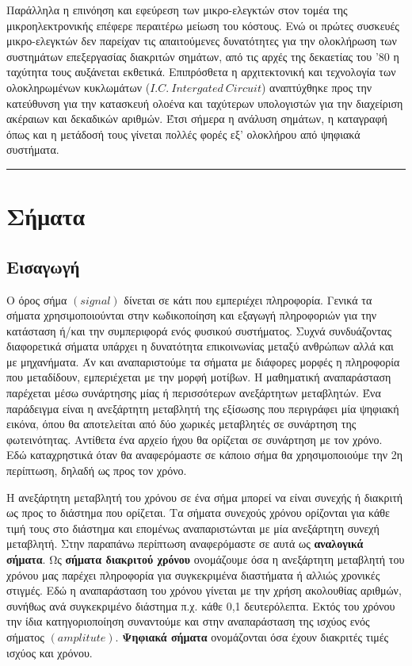 \documentclass[breaklines=true, 12pt]{article}
\begin{document}
Παράλληλα η επινόηση και εφεύρεση των μικρο-ελεγκτών στον τομέα της
μικροηλεκτρονικής επέφερε περαιτέρω μείωση του κόστους. Ενώ οι
πρώτες συσκευές μικρο-ελεγκτών δεν παρείχαν τις απαιτούμενες δυνατότητες
για την ολοκλήρωση των συστημάτων επεξεργασίας διακριτών σημάτων, από
τις αρχές της δεκαετίας του '80 η ταχύτητα τους αυξάνεται εκθετικά.
Επιπρόσθετα η αρχιτεκτονική και τεχνολογία των ολοκληρωμένων κυκλωμάτων
(\({I.C.\ Intergated\ Circuit}\)) αναπτύχθηκε προς την κατεύθυνση για την κατασκευή
ολοένα και ταχύτερων υπολογιστών για την διαχείριση ακέραιων και δεκαδικών
αριθμών. Έτσι σήμερα η ανάλυση σημάτων, η καταγραφή όπως και η μετάδοσή τους
γίνεται πολλές φορές εξ' ολοκλήρου από ψηφιακά συστήματα.

\noindent\rule{\textwidth}{0.5pt}
\section{Σήματα}
\label{sec:orgca9a577}
\subsection{Εισαγωγή}
\label{sec:orge1b0aea}
Ο όρος σήμα \({(signal)}\) δίνεται σε κάτι που εμπεριέχει πληροφορία. Γενικά
τα σήματα χρησιμοποιούνται στην κωδικοποίηση και εξαγωγή πληροφοριών για
την κατάσταση ή/και την συμπεριφορά ενός φυσικού συστήματος. Συχνά
συνδυάζοντας διαφορετικά σήματα υπάρχει η δυνατότητα επικοινωνίας μεταξύ
ανθρώπων αλλά και με μηχανήματα. Άν και αναπαριστούμε τα σήματα με διάφορες
μορφές η πληροφορία που μεταδίδουν, εμπεριέχεται με την μορφή μοτίβων. Η
μαθηματική αναπαράσταση παρέχεται μέσω συνάρτησης μίας ή περισσότερων
ανεξάρτητων μεταβλητών. Ένα παράδειγμα είναι η ανεξάρτητη μεταβλητή της
εξίσωσης που περιγράφει μία ψηφιακή εικόνα, όπου θα αποτελείται από δύο
χωρικές μεταβλητές σε συνάρτηση της φωτεινότητας. Αντίθετα ένα αρχείο ήχου
θα ορίζεται σε συνάρτηση με τον χρόνο. Εδώ καταχρηστικά όταν θα αναφερόμαστε
σε κάποιο σήμα θα χρησιμοποιούμε την 2η περίπτωση, δηλαδή ως προς τον χρόνο.

Η ανεξάρτητη μεταβλητή του χρόνου σε ένα σήμα μπορεί να είναι συνεχής ή
διακριτή ως προς το διάστημα που ορίζεται. Τα σήματα συνεχούς χρόνου
ορίζονται για κάθε τιμή τους στο διάστημα και επομένως αναπαριστώνται
με μία ανεξάρτητη συνεχή μεταβλητή. Στην παραπάνω περίπτωση αναφερόμαστε
σε αυτά ως \textbf{αναλογικά σήματα}. Ως \textbf{σήματα διακριτού χρόνου} ονομάζουμε όσα η
ανεξάρτητη μεταβλητή του χρόνου μας παρέχει πληροφορία για συγκεκριμένα
διαστήματα ή αλλιώς χρονικές στιγμές. Εδώ η αναπαράσταση του χρόνου γίνεται
με την χρήση ακολουθίας αριθμών, συνήθως ανά συγκεκριμένο διάστημα π.χ.
κάθε 0,1 δευτερόλεπτα. Εκτός του χρόνου την ίδια κατηγοριοποίηση συναντούμε
και στην αναπαράσταση της ισχύος ενός σήματος \((amplitute)\). \textbf{Ψηφιακά σήματα}
ονομάζονται όσα έχουν διακριτές τιμές ισχύος και χρόνου.
\end{document}
